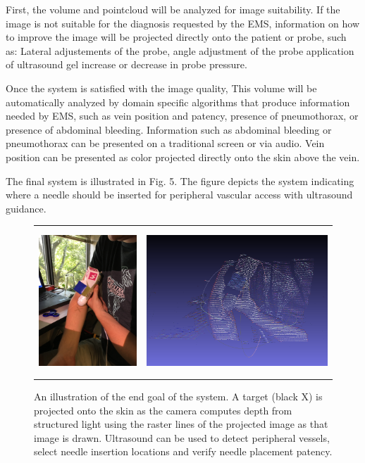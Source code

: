 \documentclass{llncs}
\begin{document}
First, the volume and pointcloud will be analyzed for image suitability. If the image is not suitable for the diagnosis requested by the EMS, information on how to improve the image will be projected directly onto the patient or probe, such as: 
Lateral adjustements of the probe,
angle adjustment of the probe
application of ultrasound gel
increase or decrease in probe pressure.

Once the system is satisfied with the image quality, This volume will be automatically analyzed by domain specific algorithms that produce information needed by EMS, such as vein position and patency, presence of pneumothorax, or presence of abdominal bleeding. Information such as abdominal bleeding or pneumothorax can be presented on a traditional screen or via audio. Vein position can be presented as color projected directly onto the skin above the vein.

The final system is illustrated in Fig. 5.  The figure depicts the system indicating where a needle should be inserted for peripheral vascular access with ultrasound guidance.

\begin{figure}
\centering
\begin{tabular}{cc}
\centering
\includegraphics[height=5.5cm,keepaspectratio]{Hastings_arm} &
\includegraphics[height=5.5cm,keepaspectratio]{Hastings_arm_pointcloud}\\
\end{tabular}

\caption{An illustration of the end goal of the system. A target (black X) is projected onto the skin as the camera computes depth from structured light using the raster lines of the projected image as that image is drawn. Ultrasound can be used to detect peripheral vessels, select needle insertion locations and verify needle placement patency.
}

\end{figure}
\end{document}
